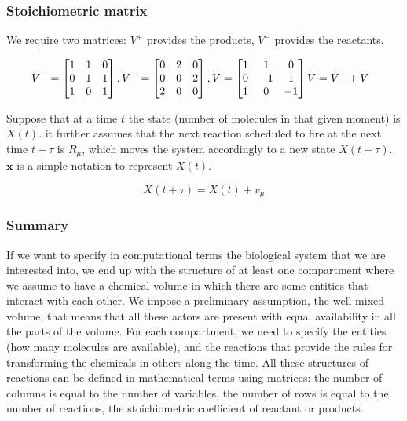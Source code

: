 \subsubsection{Stoichiometric matrix}
We require two matrices: $V^+$ provides the products, $V^-$ provides the reactants.

$$ V^- = \begin{bmatrix}1 & 1 & 0 \\ 0 & 1&1 \\ 1&0&1 \end{bmatrix}, V^+ = \begin{bmatrix}0 & 2 & 0 \\ 0 & 0&2 \\ 2&0&0 \end{bmatrix}, V = \begin{bmatrix}1 & 1 & 0 \\ 0 & -1&1 \\ 1&0&-1 \end{bmatrix}\\ V = V^+ + V^- $$

\noindent
Suppose that at a time $t$ the state (number of molecules in that given moment) is $X(t)$.
it further assumes that the next reaction scheduled to fire at the next time $t + \tau$ is $R _\mu$, which moves the system accordingly to a new state $X(t + \tau)$.
$\mathbf{x}$ is a simple notation to represent $X(t)$.

$$ X(t+\tau) = X(t)+v_\mu $$

\subsubsection{Summary} 
If we want to specify in computational terms the biological system that we are interested into, we end up with the structure of at least one compartment where we assume to have a chemical volume in which there are some entities that interact with each other.
We impose a preliminary assumption, the well-mixed volume, that means that all these actors are present with equal availability in all the parts of the volume.
For each compartment, we need to specify the entities (how many molecules are available), and the reactions that provide the rules for transforming the chemicals in others along the time.
All these structures of reactions can be defined in mathematical terms using matrices: the number of columns is equal to the number of variables, the number of rows is equal to the number of reactions, the stoichiometric coefficient of reactant or products.

